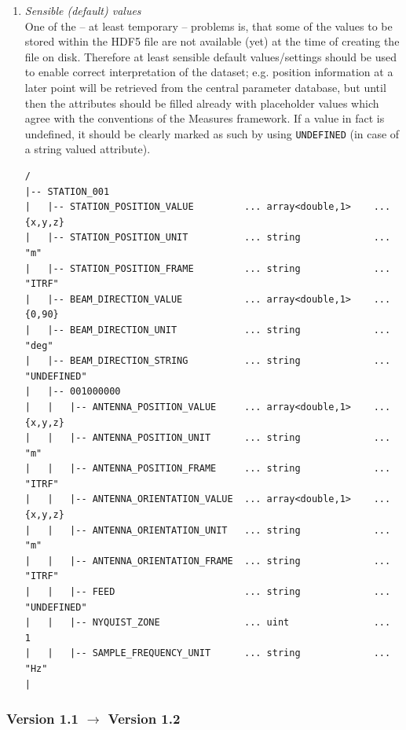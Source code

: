 \documentclass[a4paper,10pt,bibtotoc]{scrartcl}
\begin{document}
\begin{enumerate}
\begin{itemize}
  \end{itemize}
\item \textit{Sensible (default) values} \\
  One of the -- at least temporary -- problems is, that some of the values to be
  stored within the HDF5 file are not available (yet) at the time of creating the
  file on disk. Therefore at least sensible default values/settings should be used
  to enable correct interpretation of the dataset; e.g. position information at a
  later point will be retrieved from the central parameter database, but until then
  the attributes should be filled already with placeholder values which agree with
  the conventions of the Measures framework. If a value in fact is undefined, it
  should be clearly marked as such by using \verb|UNDEFINED| (in case of a string
  valued attribute).
  {\small
\begin{verbatim}
/
|-- STATION_001
|   |-- STATION_POSITION_VALUE         ... array<double,1>    ...  {x,y,z}
|   |-- STATION_POSITION_UNIT          ... string             ...  "m"
|   |-- STATION_POSITION_FRAME         ... string             ...  "ITRF"
|   |-- BEAM_DIRECTION_VALUE           ... array<double,1>    ...  {0,90}
|   |-- BEAM_DIRECTION_UNIT            ... string             ...  "deg"
|   |-- BEAM_DIRECTION_STRING          ... string             ...  "UNDEFINED"
|   |-- 001000000
|   |   |-- ANTENNA_POSITION_VALUE     ... array<double,1>    ...  {x,y,z}
|   |   |-- ANTENNA_POSITION_UNIT      ... string             ...  "m"
|   |   |-- ANTENNA_POSITION_FRAME     ... string             ...  "ITRF"
|   |   |-- ANTENNA_ORIENTATION_VALUE  ... array<double,1>    ...  {x,y,z}
|   |   |-- ANTENNA_ORIENTATION_UNIT   ... string             ...  "m"
|   |   |-- ANTENNA_ORIENTATION_FRAME  ... string             ...  "ITRF"
|   |   |-- FEED                       ... string             ...  "UNDEFINED"
|   |   |-- NYQUIST_ZONE               ... uint               ...  1
|   |   |-- SAMPLE_FREQUENCY_UNIT      ... string             ...  "Hz"
|
\end{verbatim}}
\end{enumerate}

\subsubsection*{Version 1.1 $\rightarrow$ Version 1.2}
\end{document}
